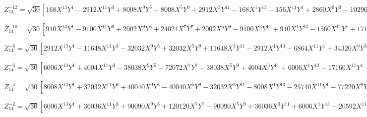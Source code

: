 \documentclass[10pt,landscape]{article}
\begin{document}
\vspace{1.2 mm}
\noindent $ Z^{-12}_{14} = \sqrt{30} [168X^{13}Y^{1} -2912X^{11}Y^{3} +8008X^{9}Y^{5} -8008X^{5}Y^{9} +2912X^{3}Y^{11} -168X^{1}Y^{13} -156X^{11}Y^{1} +2860X^{9}Y^{3} -10296X^{7}Y^{5} +10296X^{5}Y^{7} -2860X^{3}Y^{9} +156X^{1}Y^{11}] $

\vspace{1.2 mm}
\noindent $ Z^{-10}_{14} = \sqrt{30} [910X^{13}Y^{1} -9100X^{11}Y^{3} +2002X^{9}Y^{5} +24024X^{7}Y^{7} +2002X^{5}Y^{9} -9100X^{3}Y^{11} +910X^{1}Y^{13} -1560X^{11}Y^{1} +17160X^{9}Y^{3} -20592X^{7}Y^{5} -20592X^{5}Y^{7} +17160X^{3}Y^{9} -1560X^{1}Y^{11} +660X^{9}Y^{1} -7920X^{7}Y^{3} +16632X^{5}Y^{5} -7920X^{3}Y^{7} +660X^{1}Y^{9}] $

\vspace{1.2 mm}
\noindent $ Z^{-8}_{14} = \sqrt{30} [2912X^{13}Y^{1} -11648X^{11}Y^{3} -32032X^{9}Y^{5} +32032X^{5}Y^{9} +11648X^{3}Y^{11} -2912X^{1}Y^{13} -6864X^{11}Y^{1} +34320X^{9}Y^{3} +41184X^{7}Y^{5} -41184X^{5}Y^{7} -34320X^{3}Y^{9} +6864X^{1}Y^{11} +5280X^{9}Y^{1} -31680X^{7}Y^{3} +31680X^{3}Y^{7} -5280X^{1}Y^{9} -1320X^{7}Y^{1} +9240X^{5}Y^{3} -9240X^{3}Y^{5} +1320X^{1}Y^{7}] $

\vspace{1.2 mm}
\noindent $ Z^{-6}_{14} = \sqrt{30} [6006X^{13}Y^{1} +4004X^{11}Y^{3} -38038X^{9}Y^{5} -72072X^{7}Y^{7} -38038X^{5}Y^{9} +4004X^{3}Y^{11} +6006X^{1}Y^{13} -17160X^{11}Y^{1} +5720X^{9}Y^{3} +102960X^{7}Y^{5} +102960X^{5}Y^{7} +5720X^{3}Y^{9} -17160X^{1}Y^{11} +17820X^{9}Y^{1} -23760X^{7}Y^{3} -83160X^{5}Y^{5} -23760X^{3}Y^{7} +17820X^{1}Y^{9} -7920X^{7}Y^{1} +18480X^{5}Y^{3} +18480X^{3}Y^{5} -7920X^{1}Y^{7} +1260X^{5}Y^{1} -4200X^{3}Y^{3} +1260X^{1}Y^{5}] $

\vspace{1.2 mm}
\noindent $ Z^{-4}_{14} = \sqrt{30} [8008X^{13}Y^{1} +32032X^{11}Y^{3} +40040X^{9}Y^{5} -40040X^{5}Y^{9} -32032X^{3}Y^{11} -8008X^{1}Y^{13} -25740X^{11}Y^{1} -77220X^{9}Y^{3} -51480X^{7}Y^{5} +51480X^{5}Y^{7} +77220X^{3}Y^{9} +25740X^{1}Y^{11} +31680X^{9}Y^{1} +63360X^{7}Y^{3} -63360X^{3}Y^{7} -31680X^{1}Y^{9} -18480X^{7}Y^{1} -18480X^{5}Y^{3} +18480X^{3}Y^{5} +18480X^{1}Y^{7} +5040X^{5}Y^{1} -5040X^{1}Y^{5} -504X^{3}Y^{1} +504X^{1}Y^{3}] $

\vspace{1.2 mm}
\noindent $ Z^{-2}_{14} = \sqrt{30} [6006X^{13}Y^{1} +36036X^{11}Y^{3} +90090X^{9}Y^{5} +120120X^{7}Y^{7} +90090X^{5}Y^{9} +36036X^{3}Y^{11} +6006X^{1}Y^{13} -20592X^{11}Y^{1} -102960X^{9}Y^{3} -205920X^{7}Y^{5} -205920X^{5}Y^{7} -102960X^{3}Y^{9} -20592X^{1}Y^{11} +27720X^{9}Y^{1} +110880X^{7}Y^{3} +166320X^{5}Y^{5} +110880X^{3}Y^{7} +27720X^{1}Y^{9} -18480X^{7}Y^{1} -55440X^{5}Y^{3} -55440X^{3}Y^{5} -18480X^{1}Y^{7} +6300X^{5}Y^{1} +12600X^{3}Y^{3} +6300X^{1}Y^{5} -1008X^{3}Y^{1} -1008X^{1}Y^{3} +56X^{1}Y^{1}] $
\end{document}
